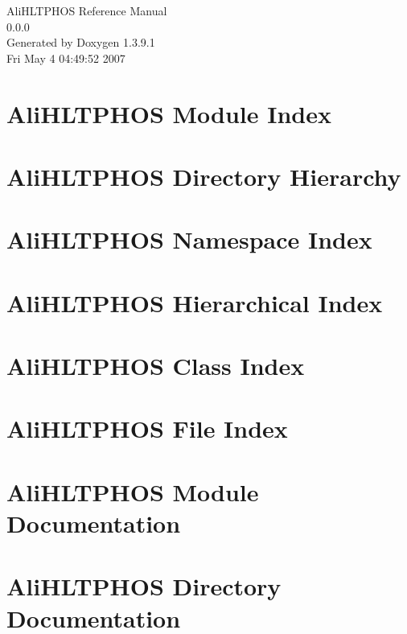 \documentclass[a4paper]{book}
\begin{document}
\begin{titlepage}
\vspace*{7cm}
\begin{center}
{\Large Ali\-HLTPHOS Reference Manual\\[1ex]\large 0.0.0 }\\
\vspace*{1cm}
{\large Generated by Doxygen 1.3.9.1}\\
\vspace*{0.5cm}
{\small Fri May 4 04:49:52 2007}\\
\end{center}
\end{titlepage}
\clearemptydoublepage
{}
\tableofcontents
\clearemptydoublepage
{}
\chapter{Ali\-HLTPHOS Module Index}

\chapter{Ali\-HLTPHOS Directory Hierarchy}

\chapter{Ali\-HLTPHOS Namespace Index}

\chapter{Ali\-HLTPHOS Hierarchical Index}

\chapter{Ali\-HLTPHOS Class Index}

\chapter{Ali\-HLTPHOS File Index}

\chapter{Ali\-HLTPHOS Module Documentation}



\chapter{Ali\-HLTPHOS Directory Documentation}


\end{document}
